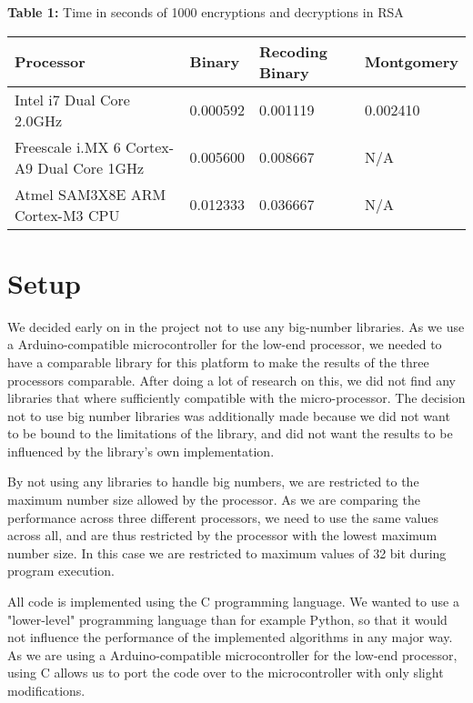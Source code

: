 \documentclass[twocolumn]{IEEEtran}
\begin{document}
\begin{table*}[!htb] 
\textbf{Table 1:} Time in seconds of 1000 encryptions and decryptions in RSA \\[1em]
    \centering
    \begin{tabular}{|l|l|l|l|}
    \hline
    {\bf Processor}                                 & {\bf Binary}   & {\bf Recoding Binary} & {\bf Montgomery} \\ \hline
    Intel i7 Dual Core 2.0GHz                 & 0.000592 & 0.001119        & 0.002410   \\ \hline
    Freescale i.MX 6 Cortex-A9 Dual Core 1GHz & 0.005600 & 0.008667        & N/A       \\ \hline
    Atmel SAM3X8E ARM Cortex-M3 CPU           & 0.012333 & 0.036667        & N/A       \\ \hline
    \end{tabular}
\end{table*}

\section{Setup}
We decided early on in the project not to use any big-number libraries. As we use a Arduino-compatible microcontroller for the low-end processor, we needed to have a comparable library for this platform to make the results of the three processors comparable. After doing a lot of research on this, we did not find any libraries that where sufficiently compatible with the micro-processor. The decision not to use big number libraries was additionally made because we did not want to be bound to the limitations of the library, and did not want the results to be influenced by the library's own implementation. 

By not using any libraries to handle big numbers, we are restricted to the maximum number size allowed by the processor. As we are comparing the performance across three different processors, we need to use the same values across all, and are thus restricted by the processor with the lowest maximum number size. In this case we are restricted to maximum values of 32 bit during program execution.

All code is implemented using the C programming language.  We wanted to use a "lower-level" programming language than for example Python, so that it would not influence the performance of the implemented algorithms in any major way. As we are using a Arduino-compatible microcontroller for the low-end processor, using C allows us to port the code over to the microcontroller with only slight modifications.
\end{document}

